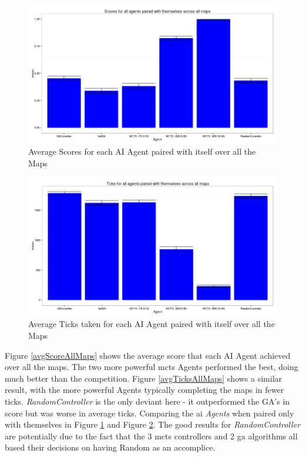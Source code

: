 \documentclass{IEEEtran}
\begin{document}
\begin{figure}[!ht]
\centering
\includegraphics[width=\linewidth]{scores-samepairs}
\caption{Average Scores for each AI Agent paired with itself over all the Maps}
\label{avgScorePairAllMaps}
\end{figure}

\begin{figure}[!ht]
\centering
\includegraphics[width=\linewidth]{ticks-samepairs}
\caption{Average Ticks taken for each AI Agent paired with itself over all the Maps}
\label{avgTicksPairAllMaps}
\end{figure}

Figure \ref{avgScoreAllMaps} shows the average score that each AI Agent achieved over all the maps. The two more powerful \gls{mcts} Agents performed the best, doing much better than the competition. Figure \ref{avgTicksAllMaps} shows a similar result, with the more powerful Agents typically completing the maps in fewer ticks. \emph{RandomController} is the only deviant here - it outperformed the GA's in score but was worse in average ticks. Comparing the \gls{ai} \emph{Agents} when paired only with themselves in Figure \ref{avgScorePairAllMaps} and Figure \ref{avgTicksPairAllMaps}. The good results for \emph{RandomController} are potentially due to the fact that the 3 \gls{mcts} controllers and 2 \gls{ga} algorithms all based their decisions on having Random as an accomplice.
\end{document}
